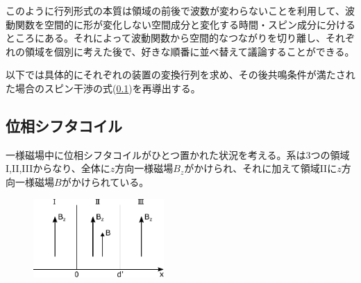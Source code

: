 このように行列形式の本質は領域の前後で波数が変わらないことを利用して、波動関数を空間的に形が変化しない空間成分と変化する時間・スピン成分に分けるところにある。それによって波動関数から空間的なつながりを切り離し、それぞれの領域を個別に考えた後で、好きな順番に並べ替えて議論することができる。

以下では具体的にそれぞれの装置の変換行列を求め、その後共鳴条件が満たされた場合のスピン干渉の式(\ref{})を再導出する。

\subsection{位相シフタコイル}
一様磁場中に位相シフタコイルがひとつ置かれた状況を考える。系は3つの領域I,II,IIIからなり、全体に$z$方向一様磁場$B_z$がかけられ、それに加えて領域IIに$z$方向一様磁場$B$がかけられている。
\begin{figure}[H]
\centering
\includegraphics[height=3cm]{matrix/phaseshifter.pdf}
\end{figure}

